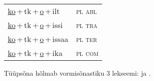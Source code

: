 \begin{minipage}{\textwidth}
\begin{sideways}
\begin{tabular}{l l}
\underline{ko}\,+\,tk\,+\,\underline{o}\,+\,ilt & \textsc{ pl abl } \\
\underline{ko}\,+\,tk\,+\,\underline{o}\,+\,issi & \textsc{ pl tra } \\
\underline{ko}\,+\,tk\,+\,\underline{o}\,+\,issaa & \textsc{ pl ter } \\
\underline{ko}\,+\,tk\,+\,\underline{o}\,+\,ika & \textsc{ pl com } \\
\end{tabular}
\end{sideways}
\label{tab:tüüpsõnamall-kotko}

\end{minipage}

 
\vspace{1em}
\noindent Tüüpsõna hõlmab vormisõnastiku 3 lekseemi:  ja .
